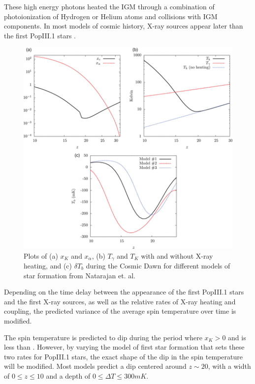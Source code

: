 These high energy photons heated the IGM through a combination of photoionization of Hydrogen or Helium atoms and collisions with IGM components. In most models of cosmic history, X-ray sources appear later than the first PopIII.1 stars \cite{furlanetto_2006}. 

\begin{figure}[htb]
\begin{center}
\includegraphics[width=0.95\linewidth]{Introduction/figures/ts_evolution.png}
\caption{Plots of (a) $x_K$ and $x_{\alpha}$, (b) $T_\gamma$ and $T_K$ with and without X-ray heating, and (c) $\delta T_b$ during the Cosmic Dawn for different models of star formation from Natarajan et. al. \cite{natarajan_2014}}
\label{Fig:cd_global}
\end{center}
\end{figure}

Depending on the time delay between the appearance of the first PopIII.1 stars and the first X-ray sources, as well as the relative rates of X-ray heating and \lya coupling, the predicted variance of the average spin temperature over time is modified. 

The spin temperature is predicted to dip during the period where $x_K>0$ and \tk is less than \tg. However, by varying the model of first star formation that sets these two rates for PopIII.1 stars, the exact shape of the dip in the spin temperature will be modified. Most models predict a dip centered around $z\sim20$, with a width of $0 \leq z \leq 10$ and a depth of $0\leq \Delta T \leq 300 mK$.

